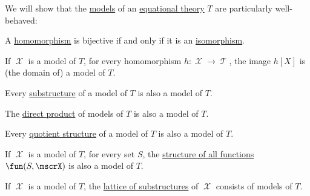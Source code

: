 \begin{proposition}\label{thm:fol_equational_theory_models}
  We will show that the \hyperref[def:fol_semantics/model]{models} of an \hyperref[def:fol_equational_theory]{equational theory} \( T \) are particularly well-behaved:

  \begin{thmenum}
     A \hyperref[def:fol_homomorphism]{homomorphism} is bijective if and only if it is an \hyperref[def:fol_isomorphism]{isomorphism}.

     If \( \mscrX \) is a model of \( T \), for every homomorphism \( h: \mscrX \to \mscrT \), the image \( h[X] \) is (the domain of) a model of \( T \).

     Every \hyperref[def:fol_substructure]{substructure} of a model of \( T \) is also a model of \( T \).

     The \hyperref[def:fol_direct_product]{direct product} of models of \( T \) is also a model of \( T \).

     Every \hyperref[def:fol_quotient_structure]{quotient structure} of a model of \( T \) is also a model of \( T \).

     If \( \mscrX \) is a model of \( T \), for every set \( S \), the \hyperref[def:fol_structure_of_functions]{structure of all functions} \( \fun(S, \mscrX) \) is also a model of \( T \).

     If \( \mscrX \) is a model of \( T \), the \hyperref[def:fol_lattice_of_substructures]{lattice of substructures} of \( \mscrX \) consists of models of \( T \).
  \end{thmenum}
\end{proposition}
